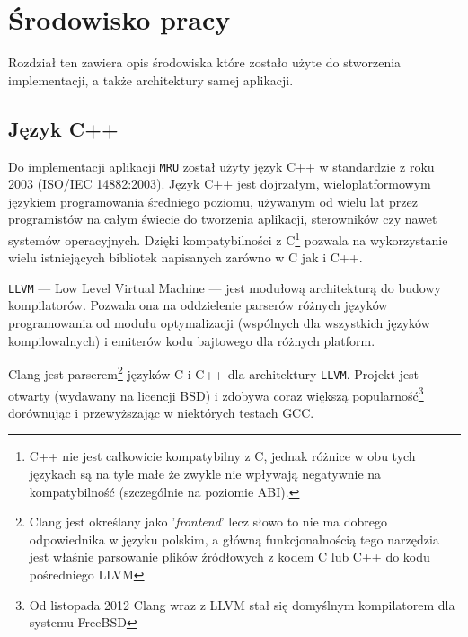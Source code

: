 \chapter{Środowisko pracy}
\label{srodowisko}
\par
Rozdział ten zawiera opis środowiska które zostało użyte do stworzenia implementacji, a także architektury samej aplikacji.

\section{Język C++}
\par
Do implementacji aplikacji \texttt{MRU} został użyty język C++ w standardzie z roku 2003 (ISO/IEC 14882:2003).
Język C++ jest dojrzałym, wieloplatformowym językiem programowania średniego poziomu, używanym od wielu lat przez programistów na całym świecie do tworzenia aplikacji, sterowników czy nawet systemów operacyjnych. Dzięki kompatybilności z C\footnote{C++ nie jest całkowicie kompatybilny z  C, jednak różnice w obu tych językach są na tyle małe że zwykle nie wpływają negatywnie na kompatybilność (szczególnie na poziomie ABI).} pozwala na wykorzystanie wielu istniejących bibliotek napisanych zarówno w C jak i C++.

\par
\texttt{LLVM} --- Low Level Virtual Machine --- jest modułową architekturą do budowy kompilatorów. Pozwala ona na oddzielenie parserów różnych języków programowania od modułu optymalizacji (wspólnych dla wszystkich języków kompilowalnych) i emiterów kodu bajtowego dla różnych platform.

\par
Clang jest parserem\footnote{Clang jest określany jako '\textit{frontend}' lecz słowo to nie ma dobrego odpowiednika w języku polskim, a główną funkcjonalnością tego narzędzia jest właśnie parsowanie plików źródłowych z kodem C lub C++ do kodu pośredniego LLVM} języków C i C++ dla architektury \texttt{LLVM}. Projekt jest otwarty (wydawany na licencji BSD) i zdobywa coraz większą popularność\footnote{Od listopada 2012 Clang wraz z LLVM stał się domyślnym kompilatorem dla systemu FreeBSD} dorównując i przewyższając w niektórych testach GCC.

